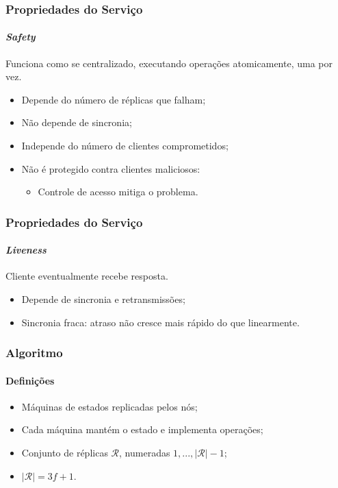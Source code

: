 \documentclass{beamer}
\begin{document}
\begin{frame}
  \frametitle{Propriedades do Serviço}
  \framesubtitle{\textit{Safety}}

  Funciona como se centralizado, executando operações atomicamente, uma por vez.
  \begin{itemize}
    \item
      Depende do número de réplicas que falham;

    \item
      Não depende de sincronia;

    \item
      Independe do número de clientes comprometidos;

    \item
      Não é protegido contra clientes maliciosos:
      \begin{itemize}
        \item
          Controle de acesso mitiga o problema.
      \end{itemize}
  \end{itemize}
\end{frame}

\begin{frame}
  \frametitle{Propriedades do Serviço}
  \framesubtitle{\textit{Liveness}}

  Cliente eventualmente recebe resposta.
  \begin{itemize}
    \item
      Depende de sincronia e retransmissões;
      
    \item
      Sincronia fraca: atraso não cresce mais rápido do que linearmente.
  \end{itemize}
\end{frame}

\begin{frame}
  \frametitle{Algoritmo}
  \framesubtitle{Definições}

  \begin{itemize}
    \item
      Máquinas de estados replicadas pelos nós;

    \item
      Cada máquina mantém o estado e implementa operações;

    \item
      Conjunto de réplicas $\mathcal{R}$, numeradas $1, ..., |\mathcal{R}| - 1$;

    \item
      $|\mathcal{R}| = 3f + 1$.
  \end{itemize}
\end{frame}
\end{document}
